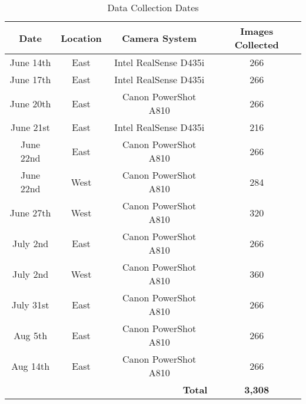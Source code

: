 
\begin{table}[!ht]
    \centering
    \caption{Data Collection Dates}
    \label{tab:image dates}
    \begin{tabular}{cccc} 
      \toprule
      \textbf{Date} & \textbf{Location} & \textbf{Camera System} & \textbf{Images Collected}\\ 
      \midrule
      June 14th & East & Intel RealSense D435i & 266\\ 
      June 17th & East & Intel RealSense D435i & 266\\ 
      June 20th & East & Canon PowerShot A810 & 266\\ 
      June 21st & East & Intel RealSense D435i & 216\\ 
      June 22nd & East & Canon PowerShot A810 & 266\\ 
      June 22nd & West & Canon PowerShot A810 & 284\\
      June 27th & West & Canon PowerShot A810 & 320\\ 
      July 2nd  & East & Canon PowerShot A810 & 266\\ 
      July 2nd  & West & Canon PowerShot A810 & 360\\
      July 31st & East & Canon PowerShot A810 & 266\\ 
      Aug 5th   & East & Canon PowerShot A810 & 266\\ 
      Aug 14th  & East & Canon PowerShot A810 & 266\\
      \midrule
      \multicolumn{3}{r}{\textbf{Total}} & \textbf{3,308}\\
      \bottomrule
    \end{tabular}
\end{table}
